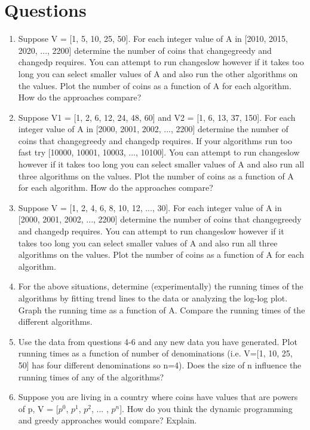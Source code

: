 \documentclass[11pt,letterpaper]{article}
\begin{document}
\section*{Questions}
\begin{enumerate}
	\item Suppose V = [1, 5, 10, 25, 50]. For each integer value of A in [2010, 2015, 2020, ..., 2200] determine the number of coins that changegreedy and changedp requires. You can attempt to run changeslow however if it takes too long you can select smaller values of A and also run the other algorithms on the values. Plot the number of coins as a function of A for each algorithm. How do the approaches compare?
	\item Suppose V1 = [1, 2, 6, 12, 24, 48, 60] and V2 = [1, 6, 13, 37, 150]. For each integer value of A in [2000, 2001, 2002, ..., 2200] determine the number of coins that changegreedy and changedp requires. If your algorithms run too fast try [10000, 10001, 10003, ..., 10100]. You can attempt to run changeslow however if it takes too long you can select smaller values of A and also run all three algorithms on the values. Plot the number of coins as a function of A for each algorithm. How do the approaches compare?
	\item Suppose V = [1, 2, 4, 6, 8, 10, 12, ..., 30]. For each integer value of A in [2000, 2001, 2002, ..., 2200] determine the number of coins that changegreedy and changedp requires. You can attempt to run changeslow however if it takes too long you can select smaller values of A and also run all three algorithms on the values. Plot the number of coins as a function of A for each algorithm.
	\item For the above situations, determine (experimentally) the running times of the algorithms by fitting trend lines to the data or analyzing the log-log plot. Graph the running time as a function of A. Compare the running times of the different algorithms.
	\item Use the data from questions 4-6 and any new data you have generated. Plot running times as a function of number of denominations (i.e. V=[1, 10, 25, 50] has four different denominations so n=4). Does the size of n influence the running times of any of the algorithms?
	\item Suppose you are living in a country where coins have values that are powers of p, V = [$p^0$, $p^1$, $p^2$, ... , $p^n$]. How do you think the dynamic programming and greedy approaches would compare? Explain.
\end{enumerate}
\end{document}
